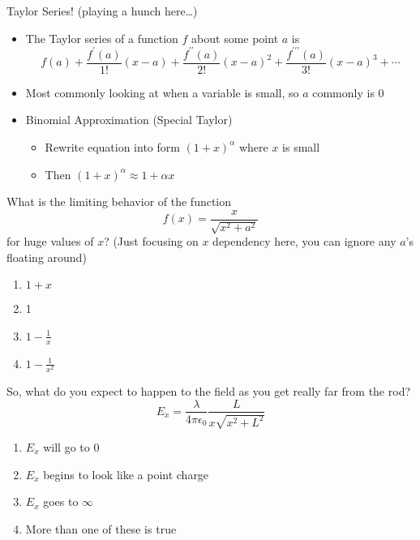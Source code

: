 \documentclass[pdf,aspectratio=169]{beamer}
\begin{document}
\begin{frame}{Taylor Series! {\scriptsize (playing a hunch here\ldots)}}
	\begin{itemize}
		\item The Taylor series of a function $f$ about some point $a$ is
			\[f(a) + \frac{f^\prime(a)}{1!}(x-a) + \frac{f^{\prime\prime}(a)}{2!}(x-a)^2 + \frac{f^{\prime\prime\prime}(a)}{3!}(x-a)^3 + \cdots\]
		\item Most commonly looking at when a variable is small, so $a$ commonly is 0
		\item Binomial Approximation (Special Taylor)
			\begin{itemize}
				\item Rewrite equation into form $(1+x)^\alpha$ where $x$ is small
				\item Then $\displaystyle (1+x)^\alpha \approx 1 + \alpha x$
			\end{itemize}
	\end{itemize}
\end{frame}

\begin{frame}{}
	What is the limiting behavior of the function
	\[f(x) = \frac{x}{\sqrt{x^2 + a^2}}\]
	for huge values of $x$? (Just focusing on $x$ dependency here, you can ignore any $a$'s floating around)
	\begin{enumerate}
		\item $\displaystyle 1 + x$
		\item 1
		\item $\displaystyle 1-\frac{1}{x}$
		\item \alert<2>{$\displaystyle 1-\frac{1}{x^2}$}
	\end{enumerate}
\end{frame}

\begin{frame}{}
	So, what do you expect to happen to the field as you get really far from the rod?
	\[E_x = \frac{\lambda}{4\pi\epsilon_0}\frac{L}{x\sqrt{x^2+L^2}}\]
	\begin{enumerate}
		\item $E_x$ will go to 0
		\item $E_x$ begins to look like a point charge
		\item $E_x$ goes to $\infty$
		\item \alert<2>{More than one of these is true}
	\end{enumerate}
\end{frame}
\end{document}
